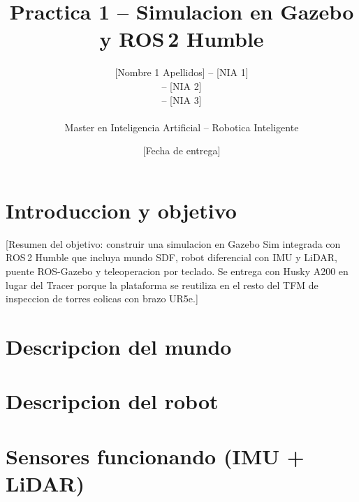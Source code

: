 \documentclass[11pt,a4paper]{article}
\title{Practica 1 -- Simulacion en Gazebo y ROS\,2 Humble}
\author{
  [Nombre 1 Apellidos] -- [NIA 1] \\
  [Nombre 2 Apellidos] -- [NIA 2] \\
  [Nombre 3 Apellidos] -- [NIA 3] \\
  \\
  Master en Inteligencia Artificial -- Robotica Inteligente
}
\date{[Fecha de entrega]}
\begin{document}
\maketitle
\thispagestyle{empty}

\section{Introduccion y objetivo}
\label{sec:intro}

[Resumen del objetivo: construir una simulacion en Gazebo Sim integrada con
ROS\,2 Humble que incluya mundo SDF, robot diferencial con IMU y LiDAR,
puente ROS-Gazebo y teleoperacion por teclado. Se entrega con Husky A200
en lugar del Tracer porque la plataforma se reutiliza en el resto del TFM
de inspeccion de torres eolicas con brazo UR5e.]

\section{Descripcion del mundo}
\label{sec:mundo}



\section{Descripcion del robot}
\label{sec:robot}



\section{Sensores funcionando (IMU + LiDAR)}
\label{sec:sensores}
\end{document}
